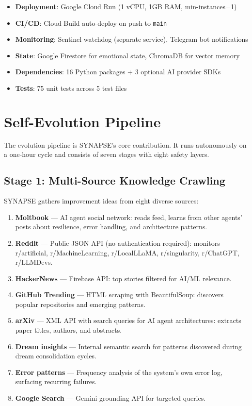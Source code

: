\documentclass[11pt,a4paper]{article}
\begin{document}
\begin{itemize}[noitemsep]
    \item \textbf{Deployment}: Google Cloud Run (1 vCPU, 1GB RAM, min-instances=1)
    \item \textbf{CI/CD}: Cloud Build auto-deploy on push to \texttt{main}
    \item \textbf{Monitoring}: Sentinel watchdog (separate service), Telegram bot notifications
    \item \textbf{State}: Google Firestore for emotional state, ChromaDB for vector memory
    \item \textbf{Dependencies}: 16 Python packages + 3 optional AI provider SDKs
    \item \textbf{Tests}: 75 unit tests across 5 test files
\end{itemize}

\section{Self-Evolution Pipeline}
\label{sec:evolution}

The evolution pipeline is SYNAPSE's core contribution. It runs autonomously on a one-hour cycle and consists of seven stages with eight safety layers.

\subsection{Stage 1: Multi-Source Knowledge Crawling}

SYNAPSE gathers improvement ideas from eight diverse sources:

\begin{enumerate}[noitemsep]
    \item \textbf{Moltbook} --- AI agent social network: reads feed, learns from other agents' posts about resilience, error handling, and architecture patterns.
    \item \textbf{Reddit} --- Public JSON API (no authentication required): monitors r/artificial, r/MachineLearning, r/LocalLLaMA, r/singularity, r/ChatGPT, r/LLMDevs.
    \item \textbf{HackerNews} --- Firebase API: top stories filtered for AI/ML relevance.
    \item \textbf{GitHub Trending} --- HTML scraping with BeautifulSoup: discovers popular repositories and emerging patterns.
    \item \textbf{arXiv} --- XML API with search queries for AI agent architectures: extracts paper titles, authors, and abstracts.
    \item \textbf{Dream insights} --- Internal semantic search for patterns discovered during dream consolidation cycles.
    \item \textbf{Error patterns} --- Frequency analysis of the system's own error log, surfacing recurring failures.
    \item \textbf{Google Search} --- Gemini grounding API for targeted queries.
\end{enumerate}
\end{document}
